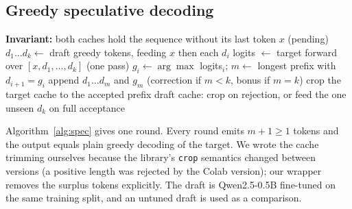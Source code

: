 \documentclass[conference]{IEEEtran}
\begin{document}
\subsection{Greedy speculative decoding}
\begin{algorithm}[t]
\caption{One round of greedy speculative decoding}\label{alg:spec}
\begin{algorithmic}[1]
\State \textbf{Invariant:} both caches hold the sequence without its last token $x$ (pending)
\State $d_1\ldots d_k \gets$ draft greedy tokens, feeding $x$ then each $d_i$
\State logits $\gets$ target forward over $[x,d_1,\ldots,d_k]$ (one pass)
\State $g_i \gets \arg\max$ logits$_i$; $m \gets$ longest prefix with $d_{i+1}=g_i$
\State append $d_1\ldots d_m$ and $g_m$ (correction if $m<k$, bonus if $m=k$)
\State crop the target cache to the accepted prefix
\State draft cache: crop on rejection, or feed the one unseen $d_k$ on full acceptance
\end{algorithmic}
\end{algorithm}
Algorithm~\ref{alg:spec} gives one round. Every round emits $m+1\ge1$ tokens and the output equals plain greedy decoding of the target. We wrote the cache trimming ourselves because the library's \texttt{crop} semantics changed between versions (a positive length was rejected by the Colab version); our wrapper removes the surplus tokens explicitly. The draft is Qwen2.5-0.5B fine-tuned on the same training split, and an untuned draft is used as a comparison.
\end{document}
